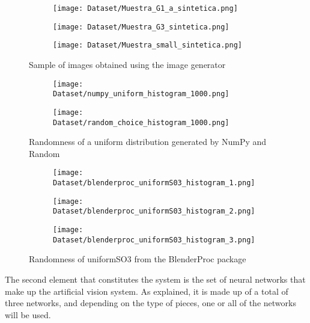 {\begin{figure}[ht]
	\ContinuedFloat
	\centering
	\begin{subfigure}[b]{0.3\linewidth}
		\texttt{[image: Dataset/Muestra\_G1\_a\_sintetica.png]}
	\end{subfigure}
	\begin{subfigure}[b]{0.3\linewidth}
		\texttt{[image: Dataset/Muestra\_G3\_sintetica.png]}
	\end{subfigure}
	\begin{subfigure}[b]{0.3\linewidth}
		\texttt{[image: Dataset/Muestra\_small\_sintetica.png]}
	\end{subfigure}
	\caption{Sample of images obtained using the image generator}
	\label{chap:Abstract fig:Muestras BlenderProc}
\end{figure}

\begin{figure}[ht]
	\ContinuedFloat
	\centering
	\begin{subfigure}[b]{0.3\linewidth}
		\texttt{[image: Dataset/numpy\_uniform\_histogram\_1000.png]}
	\end{subfigure}
	\begin{subfigure}[b]{0.3\linewidth}
		\texttt{[image: Dataset/random\_choice\_histogram\_1000.png]}
	\end{subfigure}
	\caption{Randomness of a uniform distribution generated by NumPy and Random}
	\label{chap:Abstract fig:numpy and random uniform}
	
	\begin{subfigure}[b]{0.3\linewidth}
		\texttt{[image: Dataset/blenderproc\_uniformS03\_histogram\_1.png]}
	\end{subfigure}
	\begin{subfigure}[b]{0.3\linewidth}
		\texttt{[image: Dataset/blenderproc\_uniformS03\_histogram\_2.png]}
	\end{subfigure}
	\begin{subfigure}[b]{0.3\linewidth}
		\texttt{[image: Dataset/blenderproc\_uniformS03\_histogram\_3.png]}
	\end{subfigure}
	\caption{Randomness of uniformSO3 from the BlenderProc package}
	\label{chap:Abstract fig:uniformS03}
\end{figure}

The second element that constitutes the system is the set of neural networks that make up the artificial vision system. As explained, it is made up of a total of three networks, and depending on the type of pieces, one or all of the networks will be used.

}
